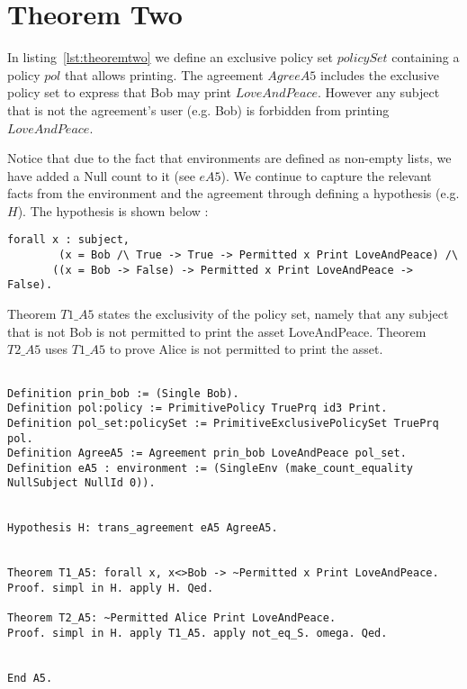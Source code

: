 \section{Theorem Two}

In listing~\ref{lst:theoremtwo} we define an exclusive policy set $policySet$ containing a policy $pol$ that allows printing. The agreement $AgreeA5$ includes the exclusive policy set to express that Bob may print $LoveAndPeace$. However any subject that is not the agreement's user (e.g. Bob) is forbidden from printing $LoveAndPeace$. 

Notice that due to the fact that environments are defined as non-empty lists, we have added a Null count to it (see $eA5$). We continue to capture the relevant facts from the environment and the agreement through defining a hypothesis (e.g. $H$). The hypothesis is shown below : 

\lstset{language=Coq}
\begin{lstlisting}[frame=single, caption={Hypothesis for Theorem Two}, label={lst:theoremtwohypo}]
forall x : subject, 
        (x = Bob /\ True -> True -> Permitted x Print LoveAndPeace) /\
       ((x = Bob -> False) -> Permitted x Print LoveAndPeace -> False). 
\end{lstlisting}

Theorem $T1\_A5$ states the exclusivity of the policy set, namely that any subject that is not Bob is not permitted to print the asset LoveAndPeace. Theorem $T2\_A5$ uses $T1\_A5$ to prove Alice is not permitted to print the asset.

\lstset{language=Coq}
\begin{lstlisting}[frame=single, caption={Theorem Two},label={lst:theoremtwo}]

Definition prin_bob := (Single Bob).
Definition pol:policy := PrimitivePolicy TruePrq id3 Print.
Definition pol_set:policySet := PrimitiveExclusivePolicySet TruePrq pol.
Definition AgreeA5 := Agreement prin_bob LoveAndPeace pol_set.
Definition eA5 : environment := (SingleEnv (make_count_equality NullSubject NullId 0)).


Hypothesis H: trans_agreement eA5 AgreeA5.


Theorem T1_A5: forall x, x<>Bob -> ~Permitted x Print LoveAndPeace.
Proof. simpl in H. apply H. Qed.

Theorem T2_A5: ~Permitted Alice Print LoveAndPeace.
Proof. simpl in H. apply T1_A5. apply not_eq_S. omega. Qed.


End A5.


\end{lstlisting}


